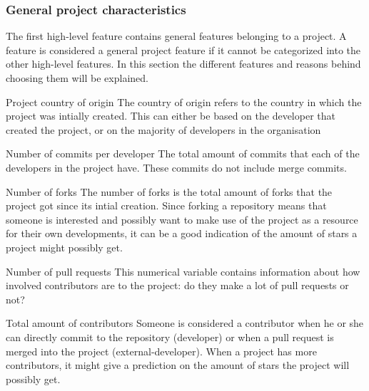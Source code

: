     \subsubsection{General project characteristics}
    The first high-level feature contains general features belonging to a project. 
    A feature is considered a general project feature if it cannot be categorized into the other high-level features.
    In this section the different features and reasons behind choosing them will be explained.
    \begin{LaTeXdescription}
        \item[Project country of origin]
        The country of origin refers to the country in which the project was intially created.
        This can either be based on the developer that created the project, or on the majority of developers in the organisation
        \item[Number of commits per developer]
        The total amount of commits that each of the developers in the project have.
        These commits do not include merge commits.
        \item[Number of forks]
        The number of forks is the total amount of forks that the project got since its intial creation.
        Since forking a repository means that someone is interested and possibly want to make use of the project as a resource for their own developments, it can be a good indication of the amount of stars a project might possibly get.
        \item[Number of pull requests]
        This numerical variable contains information about how involved contributors are to the project: do they make a lot of pull requests or not?
        \item[Total amount of contributors]
        Someone is considered a contributor when he or she can directly commit to the repository (developer) or when a pull request is merged into the project (external-developer).
        When a project has more contributors, it might give a prediction on the amount of stars the project will possibly get.

\end{LaTeXdescription}
